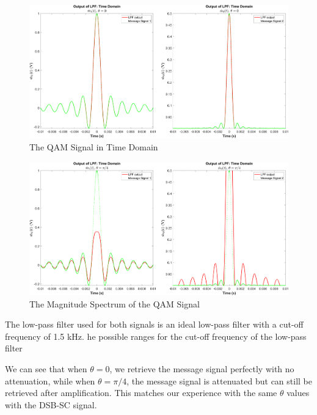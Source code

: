 \documentclass[12pt]{article}
\begin{document}
\begin{figure}[h]
    \centering
    \includegraphics[width=\textwidth]{qam_demod_lpf_theta_0}
    \caption{\label{fig:qam_demod_lpf_0}The QAM Signal in Time Domain}
\end{figure}
\begin{figure}[h]
    \centering
    \includegraphics[width=\textwidth]{qam_demod_lpf_theta_0.7854}
    \caption{\label{fig:qam_demod_lpf_p4}The Magnitude Spectrum of the QAM Signal}
\end{figure}

The low-pass filter used for both signals is an ideal low-pass filter with a cut-off frequency of 1.5 kHz. he possible ranges for the cut-off frequency of the low-pass filter %

We can see that when $\theta = 0$, we retrieve the message signal perfectly with no attenuation, while when $\theta = \pi/4$, the message signal is attenuated but can still be retrieved after amplification. This matches our experience with the same $\theta$ values with the DSB-SC signal. 
\end{document}
